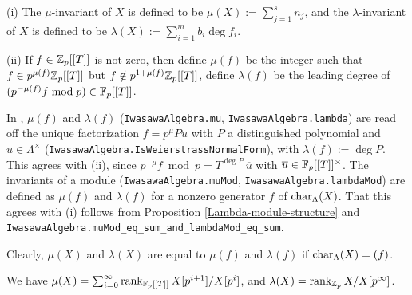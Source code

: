 \begin{definition}
\label{iwasawa-mod-invariants}
\leanok
{\rm(i)}
The $\mu$-invariant of $X$
is defined to be $\mu(X):=\sum_{j=1}^sn_j$,
and the $\lambda$-invariant of $X$
is defined to be $\lambda(X):=\sum_{i=1}^mb_i\deg f_i$.

{\rm(ii)}
If $f\in{\mathbb {Z}}_p[[T]]$ is not zero, then define
$\mu(f)$ be the integer such that
$f\in p^{\mu(f)}{\mathbb {Z}}_p[[T]]$ but
$f\notin p^{1+\mu(f)}{\mathbb {Z}}_p[[T]]$,
define $\lambda(f)$ be the leading degree of
$(p^{-\mu(f)}f\bmod p)\in{\mathbb {F}}_p[[T]]$.
\end{definition}

\begin{remark}
In {\Lean}, $\mu(f)$ and $\lambda(f)$ (\texttt{IwasawaAlgebra.mu},
\texttt{IwasawaAlgebra.lambda}) are read off the unique factorization
$f=p^{\mu}Pu$ with $P$ a distinguished polynomial and $u\in\Lambda^\times$
(\texttt{IwasawaAlgebra.IsWeierstrassNormalForm}), with $\lambda(f):=\deg P$.
This agrees with (ii), since $p^{-\mu}f\bmod p=T^{\deg P}\,\overline u$ with
$\overline u\in{\mathbb {F}}_p[[T]]^\times$. The invariants of a module
(\texttt{IwasawaAlgebra.muMod}, \texttt{IwasawaAlgebra.lambdaMod}) are defined
as $\mu(f)$ and $\lambda(f)$ for a nonzero generator $f$ of $\operatorname{char}_\Lambda(X)$.
That this agrees with (i) follows from Proposition \ref{Lambda-module-structure}
and \texttt{IwasawaAlgebra.muMod\_eq\_sum\_and\_lambdaMod\_eq\_sum}.
\end{remark}

Clearly, $\mu(X)$ and $\lambda(X)$ are equal to
$\mu(f)$ and $\lambda(f)$ if $\operatorname{char}_\Lambda(X)=(f)$.

\begin{prop}
\label{iwasawa-mod-invariants-2}
We have $\mu(X)=\sum_{i=0}^\infty\operatorname{rank}_{{\mathbb {F}}_p[[T]]}X[p^{i+1}]/X[p^i]$,
and $\lambda(X)=\operatorname{rank}_{{\mathbb {Z}}_p}X/X[p^\infty]$.
\end{prop}

